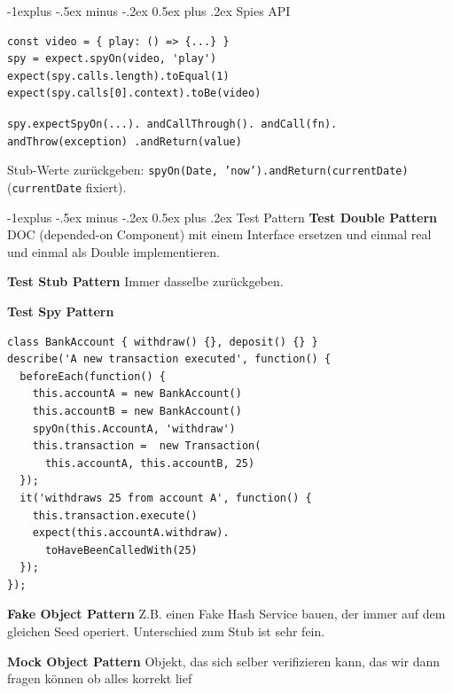 \documentclass[a4paper, fontsize=6pt]{scrartcl}
\makeatletter
\renewcommand{\subsection}{\@startsection{subsection}{2}{0mm}%
    {-1explus -.5ex minus -.2ex}%
    {0.5ex plus .2ex}%
    {\normalfont\normalsize\bfseries}}
\newcommand{\js}[1]{\texttt{#1}}
\makeatother
\begin{document}
\begin{multicols*}{5}
\subsection{Spies API}
\begin{verbatim}
const video = { play: () => {...} }
spy = expect.spyOn(video, 'play')
expect(spy.calls.length).toEqual(1)
expect(spy.calls[0].context).toBe(video)
\end{verbatim}
\js{spy.expectSpyOn(...). andCallThrough(). andCall(fn). andThrow(exception) .andReturn(value)}

Stub-Werte zurückgeben: \js{spyOn(Date, 'now').andReturn(currentDate)} (\js{currentDate} fixiert).


\subsection{Test Pattern}
\textbf{Test Double Pattern} DOC (depended-on Component) mit einem Interface ersetzen und einmal real und einmal als Double implementieren.


\textbf{Test Stub Pattern}
Immer dasselbe zurückgeben.

\textbf{Test Spy Pattern}
\begin{verbatim}
class BankAccount { withdraw() {}, deposit() {} }
describe('A new transaction executed', function() {
  beforeEach(function() {
    this.accountA = new BankAccount()
    this.accountB = new BankAccount()
    spyOn(this.AccountA, 'withdraw')
    this.transaction =  new Transaction(
      this.accountA, this.accountB, 25)
  });
  it('withdraws 25 from account A', function() {
    this.transaction.execute()
    expect(this.accountA.withdraw).
      toHaveBeenCalledWith(25)
  });
});
\end{verbatim}

\textbf{Fake Object Pattern}
Z.B. einen Fake Hash Service bauen, der immer auf dem gleichen Seed operiert. Unterschied zum Stub ist sehr fein.

\textbf{Mock Object Pattern}
Objekt, das sich selber verifizieren kann, das wir dann fragen können ob alles korrekt lief


\end{multicols*}
\end{document}

